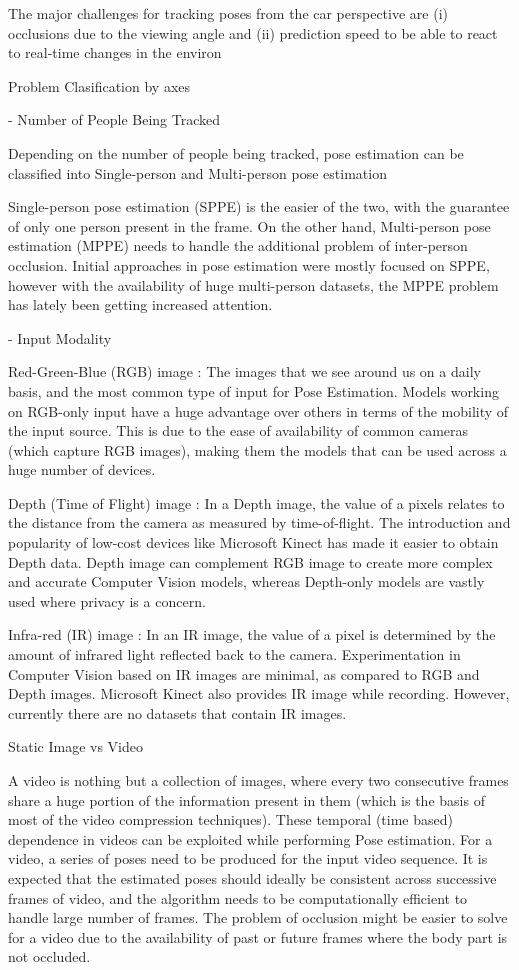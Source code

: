 The major challenges for tracking poses from the car perspective are
(i) occlusions due to the viewing angle and (ii) prediction
speed to be able to react to real-time changes in the environ

Problem Clasification by axes


- Number of People Being Tracked

Depending on the number of people being tracked, pose estimation can be classified into
Single-person and Multi-person pose estimation

Single-person pose estimation (SPPE) is the easier of the two, with the guarantee of only one person
present in the frame. On the other hand, Multi-person pose estimation (MPPE) needs to handle the
additional problem of inter-person occlusion. Initial approaches in pose estimation were mostly
focused on SPPE, however with the availability of huge multi-person datasets, the MPPE problem has
lately been getting increased attention.

- Input Modality

Red-Green-Blue (RGB) image : The images that we see around us on a daily basis, and the most common
type of input for Pose Estimation. Models working on RGB-only input have a huge advantage over
others in terms of the mobility of the input source. This is due to the ease of availability of
common cameras (which capture RGB images), making them the models that can be used across a huge
number of devices.

Depth (Time of Flight) image : In a Depth image, the value of a pixels relates to the distance from
the camera as measured by time-of-flight. The introduction and popularity of low-cost devices
like Microsoft Kinect has made it easier to obtain Depth data. Depth image can complement RGB image
to create more complex and accurate Computer Vision models, whereas Depth-only models are vastly
used where privacy is a concern.

Infra-red (IR) image : In an IR image, the value of a pixel is determined by the amount of infrared
light reflected back to the camera. Experimentation in Computer Vision based on IR images are minimal,
as compared to RGB and Depth images. Microsoft Kinect also provides IR image while recording.
However, currently there are no datasets that contain IR images.

Static Image vs Video

A video is nothing but a collection of images, where every two consecutive frames share a huge
portion of the information present in them (which is the basis of most of the video compression
techniques). These temporal (time based) dependence in videos can be exploited while performing
Pose estimation.
For a video, a series of poses need to be produced for the input video sequence. It is expected
that the estimated poses should ideally be consistent across successive frames of video, and the
algorithm needs to be computationally efficient to handle large number of frames. The problem of
occlusion might be easier to solve for a video due to the availability of past or future frames
where the body part is not occluded.

